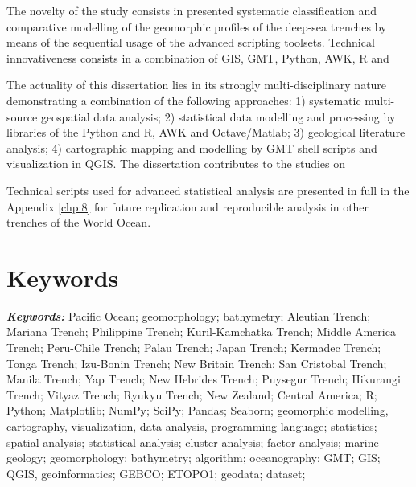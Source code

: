 \documentclass[11pt,a4paper]{report}
\providecommand{\keywords}[1]{\textbf{\textit{Keywords:}} #1}
\begin{document}
The novelty of the study consists in presented systematic classification and comparative modelling of the geomorphic profiles of the deep-sea trenches by means of the sequential usage of the advanced scripting toolsets. Technical innovativeness consists in a combination of GIS, GMT, Python, AWK, R and \par
The actuality of this dissertation lies in its strongly multi-disciplinary nature demonstrating a combination of the following approaches: 1) systematic multi-source geospatial data analysis; 2) statistical data modelling and processing by libraries of the Python and R, AWK and Octave/Matlab; 3) geological literature analysis; 4) cartographic mapping and modelling by GMT shell scripts and visualization in QGIS. The dissertation contributes to the studies on \par
Technical scripts used for advanced statistical analysis are presented in full in the Appendix \ref{chp:8} for future replication and reproducible analysis in other trenches of the World Ocean.


\chapter*{Keywords}

\keywords{Pacific Ocean; geomorphology; bathymetry; Aleutian Trench; Mariana Trench; Philippine Trench; Kuril-Kamchatka Trench; Middle America Trench; Peru-Chile Trench; Palau Trench; Japan Trench; Kermadec Trench; Tonga Trench; Izu-Bonin Trench; New Britain Trench; San Cristobal Trench; Manila Trench; Yap Trench; New Hebrides Trench; Puysegur Trench; Hikurangi Trench; Vityaz Trench; Ryukyu Trench; New Zealand; Central America; R; Python; Matplotlib; NumPy; SciPy; Pandas; Seaborn; geomorphic modelling, cartography, visualization, data analysis, programming language; statistics; spatial analysis; statistical analysis; cluster analysis; factor analysis; marine geology; geomorphology; bathymetry; algorithm; oceanography; GMT; GIS; QGIS, geoinformatics; GEBCO; ETOPO1; geodata; dataset;}
\end{document}

